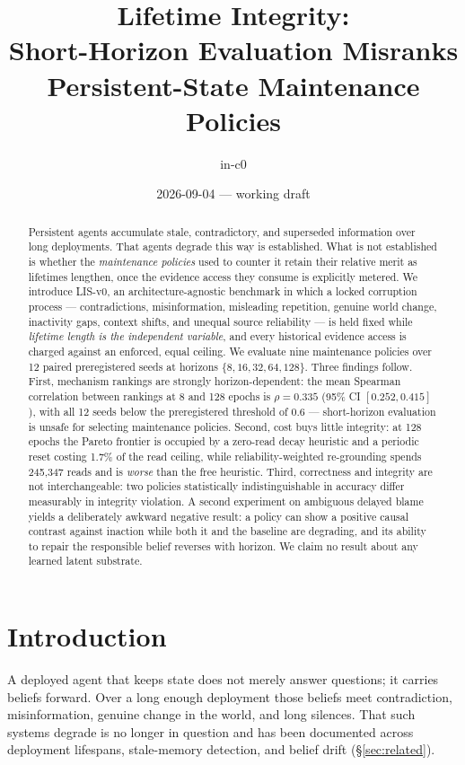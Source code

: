 \documentclass[11pt]{article}
\title{\textbf{Lifetime Integrity:\\Short-Horizon Evaluation Misranks Persistent-State Maintenance Policies}}
\author{in-c0}
\date{2026-09-04 --- working draft}
\begin{document}
\maketitle

\begin{abstract}
Persistent agents accumulate stale, contradictory, and superseded information
over long deployments. That agents degrade this way is established. What is not
established is whether the \emph{maintenance policies} used to counter it retain
their relative merit as lifetimes lengthen, once the evidence access they consume
is explicitly metered. We introduce LIS-v0, an architecture-agnostic benchmark in
which a locked corruption process --- contradictions, misinformation, misleading
repetition, genuine world change, inactivity gaps, context shifts, and unequal
source reliability --- is held fixed while \emph{lifetime length is the
independent variable}, and every historical evidence access is charged against an
enforced, equal ceiling. We evaluate nine maintenance policies over 12 paired
preregistered seeds at horizons $\{8,16,32,64,128\}$. Three findings follow.
First, mechanism rankings are strongly horizon-dependent: the mean Spearman
correlation between rankings at 8 and 128 epochs is $\rho = 0.335$
(95\% CI $[0.252, 0.415]$), with all 12 seeds below the preregistered threshold
of $0.6$ --- short-horizon evaluation is unsafe for selecting maintenance
policies. Second, cost buys little integrity: at 128 epochs the Pareto frontier
is occupied by a zero-read decay heuristic and a periodic reset costing 1.7\% of
the read ceiling, while reliability-weighted re-grounding spends 245{,}347 reads
and is \emph{worse} than the free heuristic. Third, correctness and integrity are
not interchangeable: two policies statistically indistinguishable in accuracy
differ measurably in integrity violation. A second experiment on ambiguous
delayed blame yields a deliberately awkward negative result: a policy can show a
positive causal contrast against inaction while both it and the baseline are
degrading, and its ability to repair the responsible belief reverses with
horizon. We claim no result about any learned latent substrate.
\end{abstract}

\section{Introduction}
\label{sec:intro}

A deployed agent that keeps state does not merely answer questions; it carries
beliefs forward. Over a long enough deployment those beliefs meet contradiction,
misinformation, genuine change in the world, and long silences. That such systems
degrade is no longer in question and has been documented across deployment
lifespans, stale-memory detection, and belief drift
(\S\ref{sec:related}).
\end{document}

